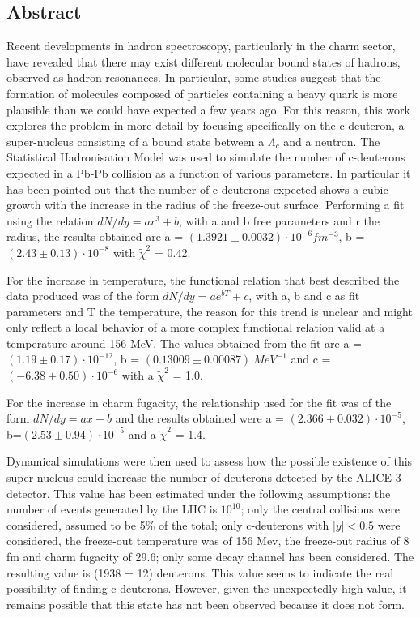 \documentclass[12pt,a4paper]{book}
\begin{document}
	\newpage
	\subsection*{Abstract}
	
	Recent developments in hadron spectroscopy, particularly in the charm sector, have revealed that there may exist different molecular bound states of hadrons, observed as hadron resonances. In particular, some studies suggest that the formation of molecules composed of particles containing a heavy quark is more plausible than we could have expected a few years ago. 
	For this reason, this work explores the problem in more detail by focusing specifically on the c-deuteron, a super-nucleus consisting of a bound state between a $\Lambda_c$ and a neutron. The Statistical Hadronisation Model was used to simulate the number of c-deuterons expected in a Pb-Pb collision as a function of various parameters. In particular it has been pointed out that the number of c-deuterons expected shows a cubic growth with the increase in the radius of the freeze-out surface. Performing a fit using the relation $dN/dy= ar^3+b$, with a and b free parameters and r the radius, the results obtained are a = $(1.3921 \pm 0.0032) \cdot 10^{-6} fm^{-3}$, b = $(2.43 \pm 0.13)\cdot 10^{-8}$ with $\tilde{\chi}^2$ = 0.42.
	
	 For the increase in temperature, the functional relation that best described the data produced was of the form $dN/dy= ae^{bT} + c$, with a, b and c as fit parameters and T the temperature, the reason for this trend is unclear and might only reflect a local behavior of a more complex functional relation valid at a temperature around 156 MeV. The values obtained from the fit are a = $(1.19 \pm 0.17) \cdot 10^{-12}$, b = $(0.13009 \pm 0.00087)\ MeV^{-1}$ and c = $(-6.38 \pm 0.50)\cdot 10^{-6}$ with a $\tilde{\chi}^2$  = 1.0.
	 
	 For the increase in charm fugacity, the relationship used for the fit was of the form $dN/dy=ax+b$ and the results obtained were a = $(2.366 \pm 0.032)\cdot 10^{-5}$, b=$(2.53\pm0.94)\cdot 10^{-5}$ and a $\tilde{\chi}^2$ = 1.4.
	
	Dynamical simulations were then used to assess how the possible existence of this super-nucleus could increase the number of deuterons detected by the ALICE 3 detector. This value has been estimated under the following assumptions: the number of events generated by the LHC is $10^{10}$; only the central collisions were considered, assumed to be 5\% of the total; only c-deuterons with $|y| < 0.5$ were considered, the freeze-out temperature was of 156 Mev, the freeze-out radius of 8 fm and charm fugacity of 29.6; only some decay channel has been considered. The resulting value is (1938 ± 12) deuterons. This value seems to indicate the real possibility of finding c-deuterons.  However, given the unexpectedly high value, it remains possible that this state has not been observed because it does not form.
	
\end{document}

